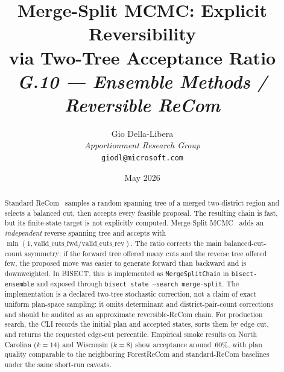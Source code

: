 \documentclass[12pt]{article}
\title{%
  \textbf{Merge-Split MCMC: Explicit Reversibility}\\
  \textbf{via Two-Tree Acceptance Ratio}\\[0.8em]
  \normalsize\textit{G.10 --- Ensemble Methods / Reversible ReCom}%
}
\author{%
  Gio Della-Libera\\
  \textit{Apportionment Research Group}\\
  \small\texttt{giodl@microsoft.com}
}
\date{May 2026}
\begin{document}
\maketitle

\begin{abstract}
\noindent
Standard ReCom~\citep{deford2021} samples a random spanning tree of a merged
two-district region and selects a balanced cut, then accepts every feasible
proposal.  The resulting chain is fast, but its finite-state target is not
explicitly computed.
Merge-Split MCMC~\citep{janson2022} adds an \emph{independent} reverse
spanning tree and accepts with
$\min(1,\mathrm{valid\_cuts\_fwd}/\mathrm{valid\_cuts\_rev})$.
The ratio corrects the main balanced-cut-count asymmetry: if the forward tree
offered many cuts and the reverse tree offered few, the proposed move was easier
to generate forward than backward and is downweighted.
In BISECT, this is implemented as \texttt{MergeSplitChain} in
\texttt{bisect-ensemble} and exposed through
\texttt{bisect state --search merge-split}.
The implementation is a declared two-tree stochastic correction, not a claim of
exact uniform plan-space sampling: it omits determinant and district-pair-count
corrections and should be audited as an approximate reversible-ReCom chain.
For production search, the CLI records the initial plan and accepted states,
sorts them by edge cut, and returns the requested edge-cut percentile.
Empirical smoke results on North Carolina ($k=14$) and Wisconsin ($k=8$) show
acceptance around~60\%, with plan quality comparable to the neighboring
ForestReCom and standard-ReCom baselines under the same short-run caveats.
\end{abstract}

\tableofcontents
\newpage










\end{document}
